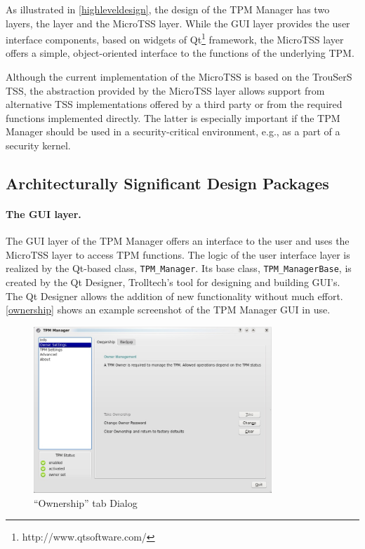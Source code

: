 \documentclass[
  american        %
]{sirrixreport}
\begin{document}
As illustrated in \autoref{highleveldesign}, the design of the TPM Manager has two layers, the \GUI layer and the MicroTSS layer.
While the GUI layer provides the user interface components, based on widgets of Qt\footnote{http://www.qtsoftware.com/} framework, the MicroTSS layer offers a simple, object-oriented interface to the functions
of the underlying TPM.


Although the current implementation of the MicroTSS is based on the TrouSerS TSS, the abstraction provided by the MicroTSS layer allows support from alternative
TSS implementations offered by a third party or from the required functions implemented directly.
The latter is especially important if the TPM Manager should be used in a security-critical
environment, e.g., as a part of a security kernel.


\subsection{Architecturally Significant Design Packages}


\paragraph{The GUI layer.}
The GUI layer of the TPM Manager offers an interface to the user and uses
the MicroTSS layer to access TPM functions. The logic of the user interface layer is realized by
the Qt-based class, \lstinline'TPM_Manager'. Its base class, \lstinline'TPM_ManagerBase', is created by the
Qt Designer, Trolltech's tool for designing and building GUI's. The
Qt Designer allows the addition of new functionality without much effort. \autoref{ownership} shows an
example screenshot of the TPM Manager GUI in use.

\begin{figure}[h]
 \centering
 \includegraphics[width=0.8\textwidth]{images/uc_owner.jpg}
 \caption{``Ownership'' tab Dialog}
 \label{ownership}
\end{figure}
\clearpage
\end{document}
